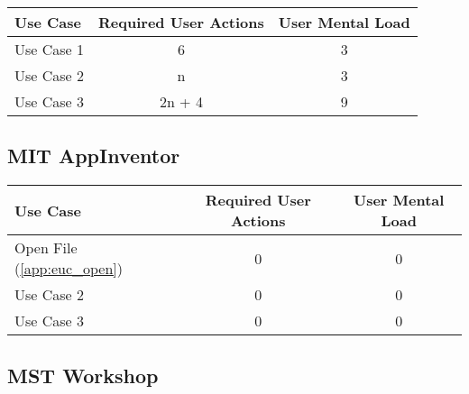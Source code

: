 \begin{tabularx}{\textwidth}{Xcc}
\textbf{Use Case} & \textbf{Required User Actions} & \textbf{User Mental Load}\\
\hline
Use Case 1                          & 6 & 3 \\
Use Case 2                          & n & 3 \\
Use Case 3                          & 2n + 4 & 9
\end{tabularx}

\subsection*{MIT AppInventor}

\begin{tabularx}{\textwidth}{Xcc}
\textbf{Use Case} & \textbf{Required User Actions} & \textbf{User Mental Load}\\
\hline
Open File (\ref{app:euc_open}) & {\color{red}0} & {\color{red}0} \\
Use Case 2                     & {\color{red}0} & {\color{red}0} \\
Use Case 3                     & {\color{red}0} & {\color{red}0}
\end{tabularx}

\subsection*{MST Workshop}




